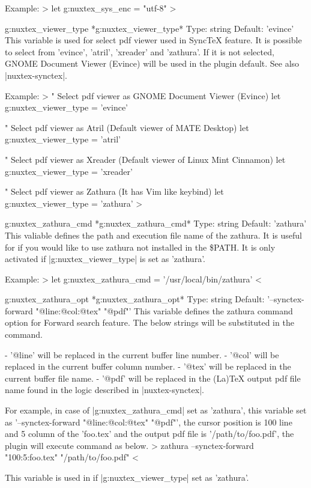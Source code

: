 \begin{verbatim*}
	Example:
>
	let g:nuxtex_sys_enc = "utf-8"
>

g:nuxtex_viewer_type				*g:nuxtex_viewer_type*
	Type: string
	Default: 'evince'
	This variable is used for select pdf viewer used in SyncTeX feature.
	It is possible to select from 'evince', 'atril', 'xreader' and
	'zathura'. If it is not selected, GNOME Document Viewer (Evince) will
	be used in the plugin default.
	See also |nuxtex-synctex|.

	Example:
>
	" Select pdf viewer as GNOME Document Viewer (Evince)
	let g:nuxtex_viewer_type = 'evince'

	" Select pdf viewer as Atril (Default viewer of MATE Desktop)
	let g:nuxtex_viewer_type = 'atril'

	" Select pdf viewer as Xreader (Default viewer of Linux Mint Cinnamon)
	let g:nuxtex_viewer_type = 'xreader'

	" Select pdf viewer as Zathura (It has Vim like keybind)
	let g:nuxtex_viewer_type = 'zathura'
>

g:nuxtex_zathura_cmd				*g:nuxtex_zathura_cmd*
	Type: string
	Default: 'zathura'
	This valiable defines the path and execution file name of the zathura.
	It is useful for if you would like to use zathura not installed in the
	\$PATH. It is only activated if |g:nuxtex_viewer_type| is set as
	'zathura'.

	Example:
>
	let g:nuxtex_zathura_cmd = '/usr/local/bin/zathura'
<

g:nuxtex_zathura_opt				*g:nuxtex_zathura_opt*
	Type: string
	Default: '--synctex-forward "@line:@col:@tex" "@pdf"'
	This variable defines the zathura command option for Forward search
	feature. The below strings will be substituted in the command.

- '@line' will be replaced in the current buffer line number.
- '@col' will be replaced in the current buffer column number.
- '@tex' will be replaced in the current buffer file name.
- '@pdf' will be replaced in the (La)TeX output pdf file name found in the
         logic described in |nuxtex-synctex|.

	For example, in case of |g:nuxtex_zathura_cmd| set as 'zathura', this
	variable set as '--synctex-forward "@line:@col:@tex" "@pdf"', the
	cursor position is 100 line and 5 column of the 'foo.tex' and the
	output pdf file is '/path/to/foo.pdf', the plugin will execute command
	as below.
>
	zathura --synctex-forward "100:5:foo.tex" "/path/to/foo.pdf"
<

	This variable is used in if |g:nuxtex_viewer_type| set as 'zathura'.
\end{verbatim*}

